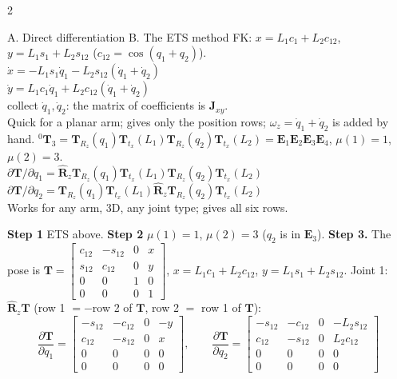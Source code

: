 \begin{multicols}{2}
\begin{twoway}{A. Direct differentiation }{B. The ETS method }
FK: $x=L_1c_1+L_2c_{12}$, $y=L_1s_1+L_2s_{12}$ ($c_{12}=\cos(q_1{+}q_2)$).\\
$\dot x=-L_1s_1\dot q_1-L_2s_{12}(\dot q_1+\dot q_2)$\\
$\dot y=L_1c_1\dot q_1+L_2c_{12}(\dot q_1+\dot q_2)$\\
collect $\dot q_1,\dot q_2$: the matrix of coefficients is $\mathbf J_{xy}$.\\
Quick for a planar arm; gives only the position rows; $\omega_z=\dot q_1+\dot q_2$ is added by hand.
\tcblower
${}^0\mathbf T_3=\mathbf T_{R_z}(q_1)\mathbf T_{t_x}(L_1)\mathbf T_{R_z}(q_2)\mathbf T_{t_x}(L_2)=\mathbf E_1\mathbf E_2\mathbf E_3\mathbf E_4$, $\mu(1)=1$, $\mu(2)=3$.\\
$\partial\mathbf T/\partial q_1=\hat{\mathbf R}_z\mathbf T_{R_z}(q_1)\mathbf T_{t_x}(L_1)\mathbf T_{R_z}(q_2)\mathbf T_{t_x}(L_2)$\\
$\partial\mathbf T/\partial q_2=\mathbf T_{R_z}(q_1)\mathbf T_{t_x}(L_1)\hat{\mathbf R}_z\mathbf T_{R_z}(q_2)\mathbf T_{t_x}(L_2)$\\
Works for any arm, 3D, any joint type; gives all six rows.
\end{twoway}
\begin{deriv}
\textbf{Step 1} ETS above. \textbf{Step 2} $\mu(1)=1$, $\mu(2)=3$ ($q_2$ is in $\mathbf E_3$). \textbf{Step 3.} The pose is $\mathbf T=\begin{bmatrix}c_{12}&-s_{12}&0&x\\s_{12}&c_{12}&0&y\\0&0&1&0\\0&0&0&1\end{bmatrix}$, $x=L_1c_1+L_2c_{12}$, $y=L_1s_1+L_2s_{12}$. Joint 1: $\hat{\mathbf R}_z\mathbf T$ (row 1 $=-$row 2 of $\mathbf T$, row 2 $=$ row 1 of $\mathbf T$):
\[\frac{\partial\mathbf T}{\partial q_1}=\begin{bmatrix}-s_{12}&-c_{12}&0&-y\\c_{12}&-s_{12}&0&x\\0&0&0&0\\0&0&0&0\end{bmatrix},\qquad\frac{\partial\mathbf T}{\partial q_2}=\begin{bmatrix}-s_{12}&-c_{12}&0&-L_2s_{12}\\c_{12}&-s_{12}&0&L_2c_{12}\\0&0&0&0\\0&0&0&0\end{bmatrix}\]

\end{deriv}
\end{multicols}
